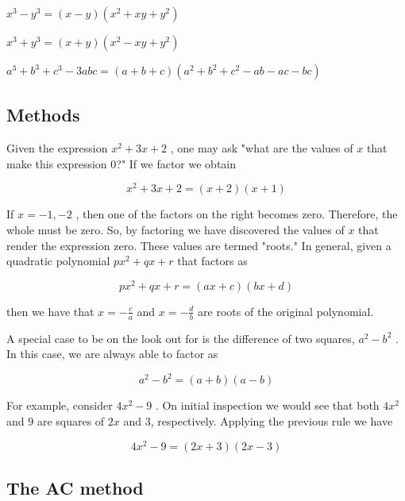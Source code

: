 ${x^3-y^3=(x-y)(x^2+xy+y^2)}$



${x^3+y^3=(x+y)(x^2-xy+y^2)}$



${a^3+b^3+c^3-3abc=(a+b+c)(a^2+b^2+c^2-ab-ac-bc)}$




\subsection{Methods}
\label{sss:meth-a9ac}




Given the expression $x^2+3x+2$ , one may ask "what are the values of $x$ that make this
expression 0?" If we factor we obtain



$$x^2+3x+2=(x+2)(x+1)$$



If $x=-1,-2$ , then one of the factors on the right becomes zero. Therefore, the whole
must be zero. So, by factoring we have discovered the values of $x$ that render the
expression zero. These values are termed "roots." In general, given a quadratic polynomial
$px^2+qx+r$ that factors as



$$px^2+qx+r=(ax+c)(bx+d)$$



then we have that $x=-\frac{c}{a}$ and $x=-\frac{d}{b}$ are roots of the original polynomial.



A special case to be on the look out for is the difference of two squares, $a^2-b^2$ . In
this case, we are always able to factor as



$$a^2-b^2=(a+b)(a-b)$$



For example, consider $4x^2-9$ . On initial inspection we would see that both $4x^2$ and
$9$ are squares of $2x$ and $3$, respectively. Applying the previous rule we have



$$4x^2-9=(2x+3)(2x-3)$$




\subsection{The AC method}
\label{sss:thea-afe9}




